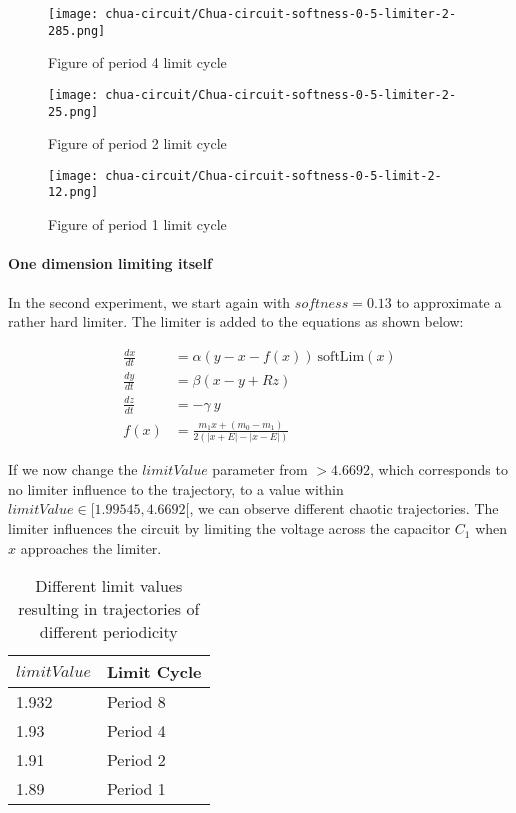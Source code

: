 \documentclass[main]{subfiles}
\begin{document}
\begin{figure}[H]
\centering
\texttt{[image: chua-circuit/Chua-circuit-softness-0-5-limiter-2-285.png]}
\caption[Figure of period 4 limit cycle]{Figure of period 4 limit cycle}
\label{figure:chaotictrajectories}
\end{figure}

\begin{figure}[H]
\centering
\texttt{[image: chua-circuit/Chua-circuit-softness-0-5-limiter-2-25.png]}
\caption[Figure of period 3 limit cycle]{Figure of period 2 limit cycle}
\label{figure:chaotictrajectories}
\end{figure}

\begin{figure}[H]
\centering
\texttt{[image: chua-circuit/Chua-circuit-softness-0-5-limit-2-12.png]}
\caption[Figure of period 1 limit cycle]{Figure of period 1 limit cycle}
\label{figure:chaotictrajectories}
\end{figure}

\paragraph{One dimension limiting itself} In the second experiment, we start again with \(softness=0.13\) to approximate a rather hard limiter. The limiter is added to the equations as shown below:

\begin{align*}
\frac{dx}{dt}&=\alpha (y-x-f(x)) ~ \text{softLim}(x)\\
\frac{dy}{dt}&=\beta (x-y + Rz)\\
\frac{dz}{dt}&=-\gamma ~ y\\
f (x) &= \frac{m_1 x + (m_0 - m_1)}{2 (| x + E | -| x - E |)}
\end{align*}

If we now change the $limitValue$ parameter from \(>4.6692\), which corresponds to no limiter influence to the trajectory, to a value within \(limitValue \in [1.99545,4.6692[\), we can observe different chaotic trajectories. The limiter influences the circuit by limiting the voltage across the capacitor \(C_1\) when \(x\) approaches the limiter.

\begin{table}[H]
\renewcommand{\arraystretch}{1.2}
\center
\begin{tabular}{@{}ll@{}}
	\toprule
   \(limitValue\) & Limit Cycle\\
   \midrule
   1.932 & Period 8 \\ 
   1.93 & Period 4 \\
   1.91  & Period 2 \\
   1.89 & Period 1 \\
   \bottomrule
\end{tabular}
\caption{Different limit values resulting in trajectories of different periodicity}
\label{table:x-0.13-periodicities}
\end{table}
\end{document}
